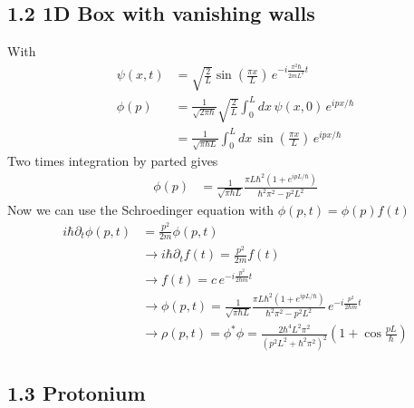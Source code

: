 \documentclass[../main.tex]{subfiles}
\begin{document}
\subsection{1.2 1D Box with vanishing walls}
With
\begin{align}
\psi(x,t)&=\sqrt{\frac{2}{L}}\sin\left(\frac{\pi x}{L}\right)
\,e^{-i\frac{\pi^2\hbar}{2mL^2}t}\\
\phi(p)
&=\frac{1}{\sqrt{2\pi\hbar}}\sqrt{\frac{2}{L}}\int_0^L dx\,\psi(x,0)\,e^{ipx/\hbar}\\
&=\frac{1}{\sqrt{\pi\hbar L}}\int_0^L dx\,\sin\left(\frac{\pi x}{L}\right)\,e^{ipx/\hbar}
\end{align}
Two times integration by parted gives
\begin{align}
\phi(p)
&=\frac{1}{\sqrt{\pi\hbar L}}\frac{\pi L\hbar^2\left(1+e^{ipL/\hbar}\right)}{\hbar^2\pi^2-p^2L^2}
\end{align}
Now we can use the Schroedinger equation with $\phi(p,t)=\phi(p)f(t)$
\begin{align}
i\hbar\partial_t\phi(p,t)&=\frac{p^2}{2m}\phi(p,t)\\
&\rightarrow i\hbar\partial_t f(t)=\frac{p^2}{2m}f(t)\\
&\rightarrow f(t)=c\,e^{-i\frac{p^2}{2\hbar m}t}\\
&\rightarrow \phi(p,t)=\frac{1}{\sqrt{\pi\hbar L}}\frac{\pi L\hbar^2\left(1+e^{ipL/\hbar}\right)}{\hbar^2\pi^2-p^2L^2} \,e^{-i\frac{p^2}{2\hbar m}t}\\
&\rightarrow \rho(p,t)=\phi^*\phi=\frac{2\hbar^4 L^2 \pi^2}{(p^2L^2+\hbar^2\pi^2)^2}\left(1+\cos\frac{pL}{\hbar}\right)
\end{align}

\subsection{1.3 Protonium}
\end{document}

